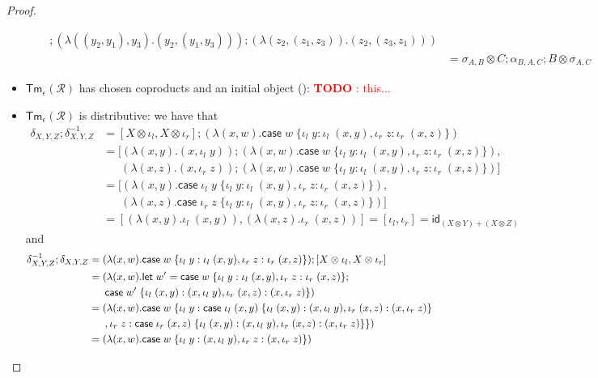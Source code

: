 \documentclass[acmsmall,screen,review]{acmart}
\newcounter{todos}
\newcommand{\todo}[1]{\stepcounter{todos} \textcolor{red}{\textbf{TODO \arabic{todos}}: #1}}
\newcommand{\mc}[1]{\ensuremath{\mathcal{#1}}}
\newcommand{\ms}[1]{\ensuremath{\mathsf{#1}}}
\newcommand{\lto}{:}
\newcommand{\linl}[1]{\iota_l\;{#1}}
\newcommand{\linr}[1]{\iota_r\;{#1}}
\newcommand{\letexpr}[3]{\ensuremath{\ms{let}\;#1 = #2;\;#3}}
\newcommand{\caseexpr}[5]{\ms{case}\;#1\;\{\linl{#2} \lto #3, \linr{#4} \lto #5\}}
\newcommand{\cmark}{\ding{51}}%
\begin{document}
\begin{proof}
\begin{itemize}
\begin{itemize}
\begin{align*}
        ; (\lambda ((y_2, y_1), y_3) . (y_2, (y_1, y_3)))
        ; (\lambda (z_2, (z_1, z_3)) . (z_2, (z_3, z_1)))
      \\
      &= \sigma_{A, B} \otimes C ; \alpha_{B, A, C} ; B \otimes \sigma_{A, C}
    \end{align*}
  \end{itemize}
  \item $\ms{Tm}_\epsilon(\mc{R})$ has chosen coproducts and an initial object (\cmark):
  \todo{this...}
  \item $\ms{Tm}_\epsilon(\mc{R})$ is distributive: we have that
  \begin{align*}
    \delta_{X, Y, Z} ; \delta^{-1}_{X, Y, Z}
    &= [X \otimes \iota_l, X \otimes \iota_r] ; (\lambda (x, w) . 
      \caseexpr{w}{y}{\linl{(x, y)}}{z}{\linr{(x, z)}}) \\
    &= [
      (\lambda (x, y) . (x, \linl{y})) 
      ; (\lambda (x, w) . \caseexpr{w}{y}{\linl{(x, y)}}{z}{\linr{(x, z)}}), \\ & \quad\;\;
      (\lambda (x, z) . (x, \linr{z})) 
      ; (\lambda (x, w) . \caseexpr{w}{y}{\linl{(x, y)}}{z}{\linr{(x, z)}})
    ] \\
    &= [
      (\lambda (x, y) . \caseexpr{\linl{y}}{y}{\linl{(x, y)}}{z}{\linr{(x, z)}}), \\ & \quad\;\;
      (\lambda (x, z) . \caseexpr{\linr{z}}{y}{\linl{(x, y)}}{z}{\linr{(x, z)}})
    ] \\
    &= [
      (\lambda (x, y) . \linl{(x, y)}),
      (\lambda (x, z) . \linr{(x, z)})
    ] = [\iota_l, \iota_r] = \ms{id}_{(X \otimes Y) + (X \otimes Z)}
  \end{align*}
  and
  \begin{align*}
    \delta^{-1}_{X, Y, Z} ; \delta_{X, Y, Z}
    &= (\lambda (x, w) .  \caseexpr{w}{y}{\linl{(x, y)}}{z}{\linr{(x, z)}})
      ; [X \otimes \iota_l, X \otimes \iota_r] \\
    &= (\lambda (x, w) . \letexpr{w'}{\caseexpr{w}{y}{\linl{(x, y)}}{z}{\linr{(x, z)}}}{ 
      \\ & \quad\;\;
      \caseexpr{w'}{(x, y)}{(x, \linl{y})}{(x, z)}{(x, \linr{z})}}) \\
    &= (\lambda (x, w) . \caseexpr{w}
      {y}{\caseexpr{\linl{(x, y)}}{(x, y)}{(x, \linl{y})}{(x, z)}{(x, \linr{z})} \\ & \quad\;\;}
      {z}{\caseexpr{\linr{(x, z)}}{(x, y)}{(x, \linl{y})}{(x, z)}{(x, \linr{z})}}
    ) \\
    &= (\lambda (x, w) . \caseexpr{w}{y}{(x, \linl{y})}{z}{(x, \linr{z})}) \\

\end{align*}
\end{itemize}
\end{proof}
\end{document}
